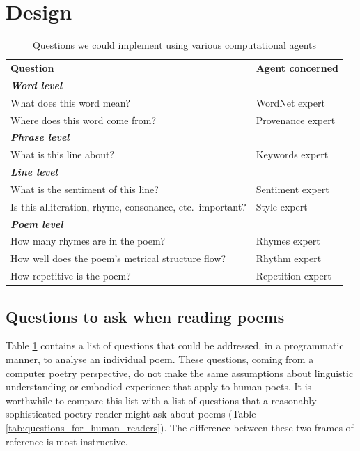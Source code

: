 \section{Design} \label{sec:design}

\begin{table}[t]
{\small
\def\arraystretch{1.1}
\begin{tabular}{p{1.8in}p{1in}}
\textbf{Question} & \textbf{Agent concerned} \\[.1cm]
\textbf{\emph{Word level}} & \\
What does this word mean? & WordNet expert \\
Where does this word come from? & Provenance expert \\[.5cm]
\textbf{\emph{Phrase level}} & \\
What is this line about? & Keywords expert \\[.5cm]
\textbf{\emph{Line level}} & \\
What is the sentiment of this line? & Sentiment expert\\
Is this alliteration, rhyme, consonance, etc.~important? & Style expert \\[.5cm]
\textbf{\emph{Poem level}} & \\
How many rhymes are in the poem? & Rhymes expert \\
How well does the poem's metrical structure flow? & Rhythm expert \\
How repetitive is the poem? & Repetition expert
\end{tabular}
}
\caption{Questions we could implement using various computational agents\label{tab:questions_for_computational_agents}}
\end{table}

\subsection{Questions to ask when reading poems}

Table \ref{tab:questions_for_computational_agents} contains a list of
questions that could be addressed, in a programmatic manner, to
analyse an individual poem.  These questions, coming from a computer
poetry perspective, do not make the same assumptions about linguistic
understanding or embodied experience that apply to human poets.  It is
worthwhile to compare this list with a list of questions that a
reasonably sophisticated poetry reader might ask about poems (Table
\ref{tab:questions_for_human_readers}).  The difference between these
two frames of reference is most instructive.

